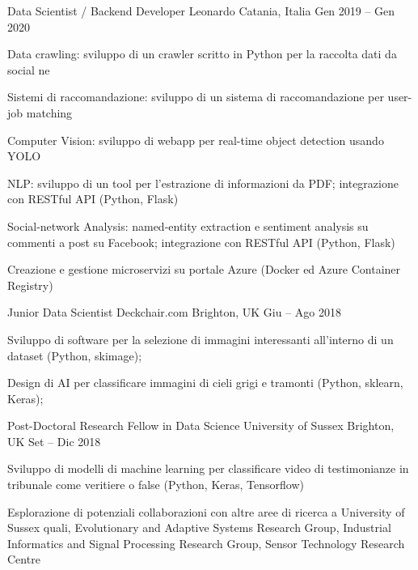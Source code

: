 \begin{cventries}
    \cventry
    {Data Scientist / Backend Developer}
    {Leonardo}    
    {Catania, Italia}
    {Gen 2019 -- Gen 2020}
    {
      \begin{cvitems}
        \item {Data crawling: sviluppo di un crawler scritto in Python per la raccolta dati da social ne}
        \item {Sistemi di raccomandazione: sviluppo di un sistema di raccomandazione per user-job matching}
        \item {Computer Vision: sviluppo di webapp per real-time object detection usando YOLO}
        \item {NLP: sviluppo di un tool per l'estrazione di informazioni da PDF; integrazione con RESTful API (Python, Flask)}
        \item {Social-network Analysis: named-entity extraction e sentiment analysis su commenti a post su Facebook; integrazione con RESTful API (Python, Flask)}
        \item {Creazione e gestione microservizi su portale Azure (Docker ed Azure Container Registry)}
      \end{cvitems}
    }

    \cventry
    {Junior Data Scientist}
    {Deckchair.com}
    {Brighton, UK}
    {Giu -- Ago 2018}
    {
      \begin{cvitems}
        \item Sviluppo di software per la selezione di immagini interessanti all'interno di un dataset (Python, skimage);
        \item Design di AI per classificare immagini di cieli grigi e tramonti (Python, sklearn, Keras);
      \end{cvitems}
    }
  \end{cventries}

\newpage

  \begin{cventries}
    \cventry
    {Post-Doctoral Research Fellow in Data Science}
    {University of Sussex}
    {Brighton, UK}
    {Set -- Dic 2018}
    {
      \begin{cvitems}
        \item Sviluppo di modelli di machine learning per classificare video di testimonianze in tribunale come veritiere o false (Python, Keras, Tensorflow)
        \item Esplorazione di potenziali collaborazioni con altre aree di ricerca a University of Sussex quali, Evolutionary and Adaptive Systems Research Group, Industrial Informatics and Signal Processing Research Group, Sensor Technology Research Centre
      \end{cvitems}
    }
  \end{cventries}

